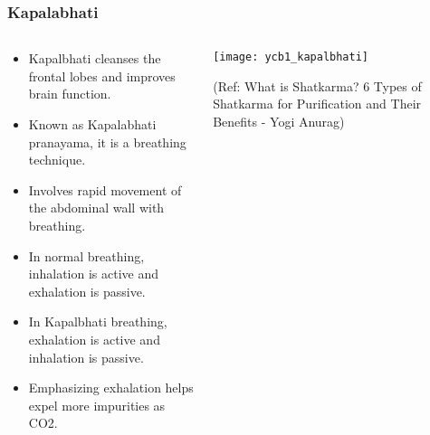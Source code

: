 \begin{frame}[fragile]\frametitle{Kapalabhati}
\begin{columns}
    \begin{column}[T]{0.5\linewidth}
      \begin{itemize}
          \item Kapalbhati cleanses the frontal lobes and improves brain function.
          \item Known as Kapalabhati pranayama, it is a breathing technique.
          \item Involves rapid movement of the abdominal wall with breathing.
          \item In normal breathing, inhalation is active and exhalation is passive.
          \item In Kapalbhati breathing, exhalation is active and inhalation is passive.
          \item Emphasizing exhalation helps expel more impurities as CO2.
      \end{itemize}
    \end{column}
    \begin{column}[T]{0.5\linewidth}
        \begin{center}
        \texttt{[image: ycb1\_kapalbhati]}
		
		{\tiny (Ref: What is Shatkarma? 6 Types of Shatkarma for Purification and Their Benefits - Yogi Anurag)}	
        \end{center}	
    \end{column}
\end{columns}
\end{frame}

